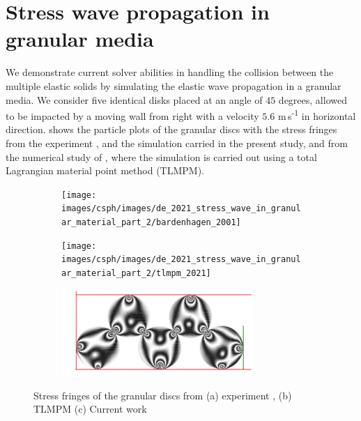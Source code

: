 \section{Stress wave propagation in granular media}
\label{sec:results-stress-wave-propagation-with-friction}
We demonstrate current solver abilities in handling the collision between the
multiple elastic solids by simulating the elastic wave propagation in a granular
media. We consider five identical disks placed at an angle of $45$ degrees,
allowed to be impacted by a moving wall from right with a velocity $5.6$
m\,s\textsuperscript{-1} in horizontal direction.
 shows the particle plots of the granular discs
with the stress fringes from the experiment \citep{guilkey2001improved}, and the
simulation carried in the present study, and from the numerical study of
\textcite{de2021modelling}, where the simulation is carried out using a total
Lagrangian material point method (TLMPM).
\begin{figure}[!htpb]
  \centering
  \begin{subfigure}{1.0\textwidth}
    \centering
    \texttt{[image: images/csph/images/de\_2021\_stress\_wave\_in\_granular\_material\_part\_2/bardenhagen\_2001]}
    \subcaption{}\label{fig:de-stress-wave-bardenhagen}
  \end{subfigure}

  \begin{subfigure}{1.0\textwidth}
    \centering
    \texttt{[image: images/csph/images/de\_2021\_stress\_wave\_in\_granular\_material\_part\_2/tlmpm\_2021]}
    \subcaption{}\label{}
  \end{subfigure}

  \begin{subfigure}{1.0\textwidth}
    \centering
    \includegraphics[width=0.8\textwidth]{figures/csph/figures/de_2021_stress_wave_in_granular_material_part_2/case_mohseni/time0}
    \subcaption{}\label{fig:de-stress-wave-current}
  \end{subfigure}
  \caption{Stress fringes of the granular discs from (a) experiment
    \citep{guilkey2001improved}, (b) TLMPM \citep{de2021modelling} (c) Current work}
\label{fig:de-stress-wave-compare}
\end{figure}
